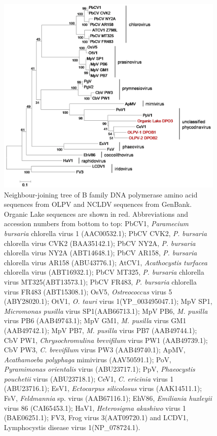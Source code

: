 \begin{figure}
\includegraphics[width=\textwidth]{olv_figures/OLPV_full_dpo.jpg}
\caption[Phylogeny of \acs{OLPV} B family DNA polymerase sequences]{Neighbour-joining tree of B family DNA polymerase amino acid sequences from \acs{OLPV} and \acs{NCLDV} sequences from GenBank. 
Organic Lake sequences are shown in red.
Abbreviations and accession numbers from bottom to top: PbCV1, \emph{Paramecium bursaria} chlorella virus 1 (AAC00532.1); PbCV CVK2, \emph{P. bursaria} chlorella virus CVK2 (BAA35142.1); PbCV NY2A,  \emph{P. bursaria} chlorella virus NY2A (ABT14648.1); PbCV AR158, \emph{P. bursaria} chlorella virus AR158 (ABU43776.1); AtCV1, \emph{Acathocystis turfacea} chlorella virus (ABT16932.1); PbCV MT325,  \emph{P. bursaria} chlorella virus MT325(ABT13573.1); PbCV FR483, \emph{P. bursaria} chlorella virus FR483 (ABT15308.1); OsV5, \emph{Ostreococcus} virus 5 (ABY28020.1); OtV1, \emph{O. tauri} virus 1(YP\_003495047.1);  MpV SP1, \emph{Micromonas pusilla} virus SP1(AAB66713.1); MpV PB6, \emph{M. pusilla} virus PB6 (AAB49743.1); MpV GM1, \emph{M. pusilla} virus GM1 (AAB49742.1); MpV PB7, \emph{M. pusilla} virus PB7 (AAB49744.1); CbV PW1, \emph{Chrysochromulina brevifilum} virus PW1 (AAB49739.1); CbV PW3, \emph{C. brevifilum} virus PW3 (AAB49740.1); ApMV, \emph{Acathamoeba polyphaga} mimivirus (AAV50591.1); PoV,  \emph{Pyramimonas orientalis} virus (ABU23717.1); PpV, \emph{Phaeocystis pouchetii} virus (ABU23718.1); CeV1, \emph{C. ericinia} virus 1 (ABU23716.1); EsV1, \emph{Ectocarpus silicolosus} virus (AAK14511.1); FsV, \emph{Feldmannia} sp. virus (AAB67116.1); EhV86, \emph{Emiliania huxleyii} virus 86 (CAI65453.1); HaV1, \emph{Heterosigma akashiwo} virus 1 (BAE06251.1); FV3, Frog virus 3(AAT09720.1) and LCDV1, Lymphocystis disease virus 1(NP\_078724.1). 
}
\label{fig:OLPV_full_dpo}

\end{figure}
